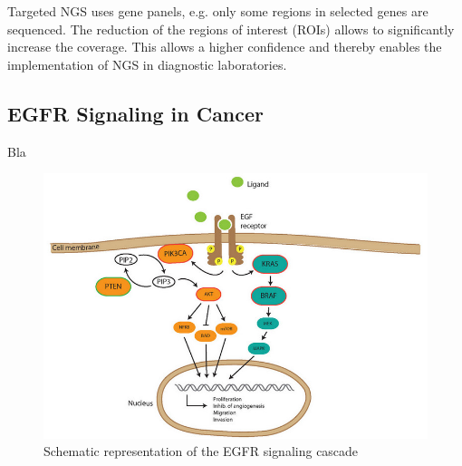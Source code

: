 Targeted NGS uses gene panels, e.g. only some regions in selected genes are
sequenced. The reduction of the regions of interest (ROIs) allows to
significantly increase the coverage. This allows a higher confidence and thereby
enables the implementation of NGS in diagnostic laboratories.

\subsection{EGFR Signaling in Cancer}

Bla {\cite{targeting_egfr:2012}}

\begin{figure}[ht]
  \begin{center}
    \includegraphics[scale=2.5,angle=0]{egfr_signaling.png}
    \caption{Schematic representation of the EGFR signaling cascade {\cite{targeting_egfr:2012}}}
  \end{center}
\end{figure}

